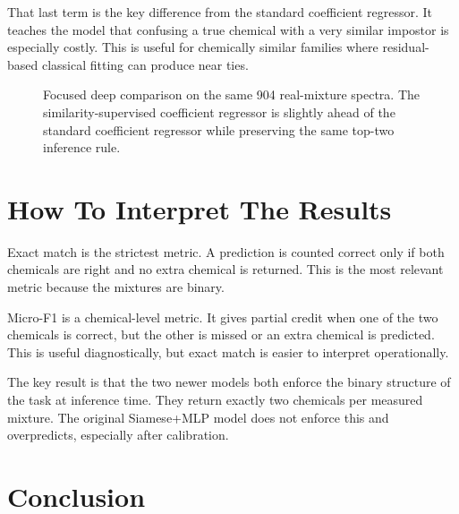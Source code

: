 \documentclass[11pt]{article}
\begin{document}
That last term is the key difference from the standard coefficient regressor. It teaches the model that confusing a true chemical with a very similar impostor is especially costly. This is useful for chemically similar families where residual-based classical fitting can produce near ties.

\begin{figure}[ht]
\centering
{}
\caption{Focused deep comparison on the same 904 real-mixture spectra. The similarity-supervised coefficient regressor is slightly ahead of the standard coefficient regressor while preserving the same top-two inference rule.}
\end{figure}

\section*{How To Interpret The Results}

Exact match is the strictest metric. A prediction is counted correct only if both chemicals are right and no extra chemical is returned. This is the most relevant metric because the mixtures are binary.

Micro-F1 is a chemical-level metric. It gives partial credit when one of the two chemicals is correct, but the other is missed or an extra chemical is predicted. This is useful diagnostically, but exact match is easier to interpret operationally.

The key result is that the two newer models both enforce the binary structure of the task at inference time. They return exactly two chemicals per measured mixture. The original Siamese+MLP model does not enforce this and overpredicts, especially after calibration.

\section*{Conclusion}
\end{document}
